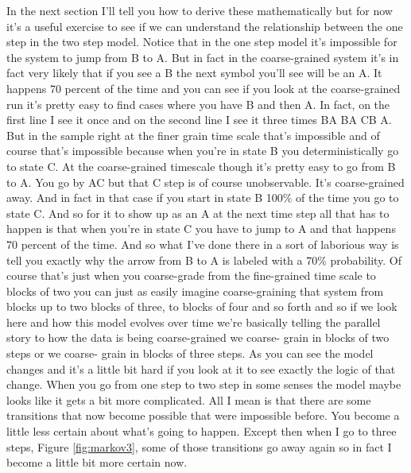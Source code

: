 \documentclass[]{article}
\begin{document}
 In the
next section I'll tell you how to derive
these mathematically but for now it's a
useful exercise to see if we can
understand the relationship between the
one step in the two step model.
Notice that in the one step model it's
impossible for the system to jump from B
to A. But in fact in the coarse-grained
system it's in fact very likely that if
you see a B the next symbol you'll see
will be an A. It happens 70 percent of
the time and you can see if you look at
the coarse-grained run it's pretty easy to
find cases where you have B and then A.
In fact, on the first line I see it once
and on the second line I see it three
times BA BA CB A. But in the sample right
at the finer grain time scale that's
impossible and of course that's
impossible because when you're in state B
you deterministically go to state C. At the
coarse-grained timescale though it's
pretty easy to go from B to A. You go by
AC but that C step is of course
unobservable. It's coarse-grained away.
And in fact in that case if you start in
state B 100\% of the time you go to state
C. And so for it to show up as an A at
the next time step all that has to
happen is that when you're in state C
you have to jump to A and that happens 70
percent of the time. And so what I've
done there in a sort of laborious way is
tell you exactly why the arrow from B to
A is labeled with a 70\% probability. Of
course that's just when you coarse-grade
from the fine-grained time scale to
blocks of two you can just as easily
imagine coarse-graining that
system from blocks up to two blocks of
three, to blocks of four and so forth
and so if we look here and how this
model evolves over time we're basically
telling the parallel story to how the
data is being coarse-grained we coarse-
grain in blocks of two steps or we coarse-
grain in blocks of three steps. As you
can see the model changes and it's a
little bit hard if you look at it to see
exactly the logic of that change. When
you go from one step to two step in some
senses the model maybe looks like it
gets a bit more complicated. All I mean
is that there are some transitions that
now become possible that were impossible
before. You become a little less certain
about what's going to happen. Except then
when I go to three steps, Figure \ref{fig:markov3}, some of those
transitions go away again so in fact
I become a little bit more certain
now. 
\end{document}
